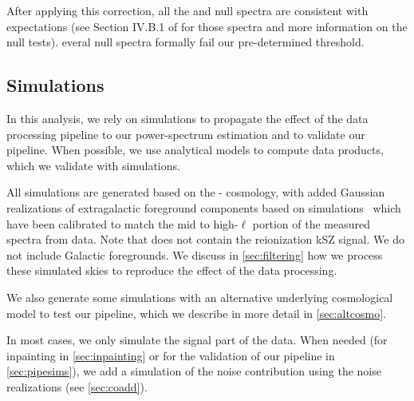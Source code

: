 After applying this correction, all the \TE{} and \EE{} null spectra are consistent with expectations (see Section IV.B.1 of \citep{ge24} for those spectra and more information on the null tests). 
everal \TT{} null spectra formally fail our pre-determined threshold. 

\subsection{Simulations}
\label{sec:simulations}

In this analysis, we rely on simulations to propagate the effect of the data processing pipeline to our power-spectrum estimation and to validate our pipeline. When possible, we use analytical models to compute data products, which we validate with simulations.

All simulations are generated based on the \planck{}-\lcdm{} cosmology, with added Gaussian realizations of extragalactic foreground components based on \agora{} simulations~\citep{omori22} which have been calibrated to match the mid to high-$\ell$ portion of the measured spectra from data.
Note that \agora{} does not contain the reionization kSZ signal.
We do not include Galactic foregrounds.
We discuss in \cref{sec:filtering} how we process these simulated skies to reproduce the effect of the data processing.

We also generate some simulations with an alternative underlying cosmological model to test our pipeline, which we describe in more detail in \cref{sec:altcosmo}.

In most cases, we only simulate the signal part of the data. When needed (for inpainting in \cref{sec:inpainting} or for the validation of our pipeline in \cref{sec:pipesims}), we add a simulation of the noise contribution using the noise realizations (see \cref{sec:coadd}).

